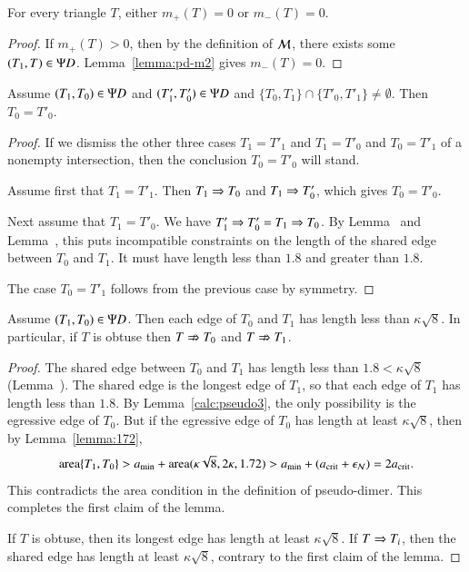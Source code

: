 \begin{corollary}  
  For every triangle $T$, either $m_+(T)=0$ or $m_-(T)=0$.
\end{corollary}

\begin{proof}  
  If $m_+(T)>0$, then by the definition of $\mathcal M$, there exists some $(T_1,T)\in\Psi D$.  
  Lemma~\ref{lemma:pd-m2} gives $m_-(T)=0$.
\end{proof}

\begin{lemma}  
  Assume $(T_1,T_0)\in \Psi D$ and $(T'_1,T'_0)\in\Psi D$ and
  $\{T_0,T_1\}\cap\{T'_0,T'_1\} \ne \emptyset$.  Then $T_0 = T'_0$.
\end{lemma}

\begin{proof}  
  If we dismiss the other three cases $T_1=T'_1$ and $T_1=T'_0$ and
  $T_0=T'_1$ of a nonempty intersection, then the conclusion $T_0 =
  T'_0$ will stand.

  Assume first that $T_1 = T'_1$.  Then $T_1\Rightarrow T_0$ and $T_1\Rightarrow
  T'_0$, which gives $T_0=T'_0$.

  Next assume that $T_1=T'_0$.  We have $T'_1\Rightarrow T'_0 = T_1 \Rightarrow T_0$.
  By Lemma~ and
  Lemma~, this puts incompatible constraints on the
  length of the shared edge between $T_0$ and $T_1$.  It must have
  length less than $1.8$ and greater than $1.8$.

  The case $T_0=T'_1$ follows from the previous case by symmetry.
\end{proof}

\begin{lemma}
  Assume $(T_1,T_0)\in\Psi D$.  Then each edge of $T_0$ and $T_1$ has
  length less than $\kappa\sqrt8$.  In particular, if $T$ is obtuse
  then $T\nRightarrow T_0$ and $T \nRightarrow T_1$.
\end{lemma}

\begin{proof} 
  The shared edge between $T_0$ and $T_1$ has length less than $1.8 <
  \kappa\sqrt8$ (Lemma~).  The shared edge is the
  longest edge of $T_1$, so that each edge of $T_1$ has length less
  than $1.8$.  By Lemma~\ref{calc:pseudo3}, the only possibility is the egressive edge of $T_0$.
  But if the egressive edge of $T_0$ has length at least
  $\kappa\sqrt8$, then by Lemma~\ref{lemma:172},
\[
{\operatorname{area}}\{T_1,T_0\} > a_\text{min} + {\operatorname{area}}(\kappa\sqrt8,2\kappa,1.72) 
> a_\text{min} + (a_\text{crit} + \epsilon_{\mathcal N}) = 2a_\text{crit}.
\]
This contradicts the area condition in the definition of pseudo-dimer.
This completes the first claim of the lemma.

If $T$ is obtuse, then its longest edge has length at least
$\kappa\sqrt8$.  If $T\Rightarrow T_i$, then the shared edge has length at
least $\kappa\sqrt8$, contrary to the first claim of the lemma.
\end{proof}

